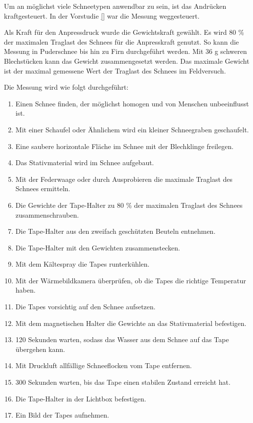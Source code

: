 

Um an möglichst viele Schneetypen anwendbar zu sein, ist das Andrücken kraftgesteuert. In der Vorstudie \ref{} war die Messung weggesteuert.

Als Kraft für den Anpressdruck wurde die Gewichtskraft gewählt. Es wird 80 \% der maximalen Traglast des Schnees für die Anpresskraft genutzt. So kann die Messung in Puderschnee bis hin zu Firn durchgeführt werden. Mit 36 g schweren Blechstücken kann das Gewicht zusammengesetzt werden. Das maximale Gewicht ist der maximal gemessene Wert der Traglast des Schnees im Feldversuch.

Die Messung wird wie folgt durchgeführt:

\begin{enumerate}
\item Einen Schnee finden, der möglichst homogen und von Menschen unbeeinflusst ist.
\item Mit einer Schaufel oder Ähnlichem wird ein kleiner Schneegraben geschaufelt.
\item Eine saubere horizontale Fläche im Schnee mit der Blechklinge freilegen.
\item Das Stativmaterial wird im Schnee aufgebaut.
\item Mit der Federwaage oder durch Ausprobieren die maximale Traglast des Schnees ermitteln.
\item Die Gewichte der Tape-Halter zu 80 \% der maximalen Traglast des Schnees zusammenschrauben.
\item Die Tape-Halter aus den zweifach geschützten Beuteln entnehmen.
\item Die Tape-Halter mit den Gewichten zusammenstecken.
\item Mit dem Kältespray die Tapes runterkühlen.
\item Mit der Wärmebildkamera überprüfen, ob die Tapes die richtige Temperatur haben.
\item Die Tapes vorsichtig auf den Schnee aufsetzen.
\item Mit dem magnetischen Halter die Gewichte an das Stativmaterial befestigen.
\item 120 Sekunden warten, sodass das Wasser aus dem Schnee auf das Tape übergehen kann.
\item Mit Druckluft allfällige Schneeflocken vom Tape entfernen.
\item 300 Sekunden warten, bis das Tape einen stabilen Zustand erreicht hat.
\item Die Tape-Halter in der Lichtbox befestigen.
\item Ein Bild der Tapes aufnehmen.
\end{enumerate}
